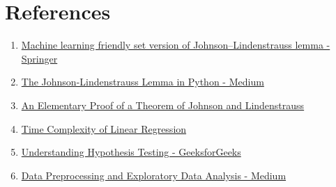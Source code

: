 \documentclass[conference]{IEEEtran}
\begin{document}
\section{References}
\begin{enumerate}

    \item \href{https://link.springer.com/article/10.1007/s10115-019-01412-8#:~:text=The%20widely%20discussed%20and%20applied,a%20user%2Ddefined%20error%20parameter%20}{Machine learning friendly set version of Johnson–Lindenstrauss lemma - Springer}

    \item \href{https://medium.com/@r3d_robot/the-johnson-lindenstrauss-lemma-ef10698d0dc6}{The Johnson-Lindenstrauss Lemma in Python - Medium}
    
    \item \href{https://cseweb.ucsd.edu/~dasgupta/papers/jl.pdf}{An Elementary Proof of a Theorem of Johnson and Lindenstrauss}

    \item \href{https://datascience.stackexchange.com/questions/35804/what-is-the-time-complexity-of-linear-regression}{Time Complexity of Linear Regression}
    \item \href{https://www.geeksforgeeks.org/understanding-hypothesis-testing/}{Understanding Hypothesis Testing - GeeksforGeeks}
    \item \href{https://medium.com/analytics-vidhya/data-preprocessing-and-exploratory-data-analysis-for-machine-learning-75b8a6468b72}{Data Preprocessing and Exploratory Data Analysis - Medium}

\end{enumerate}
\end{document}
